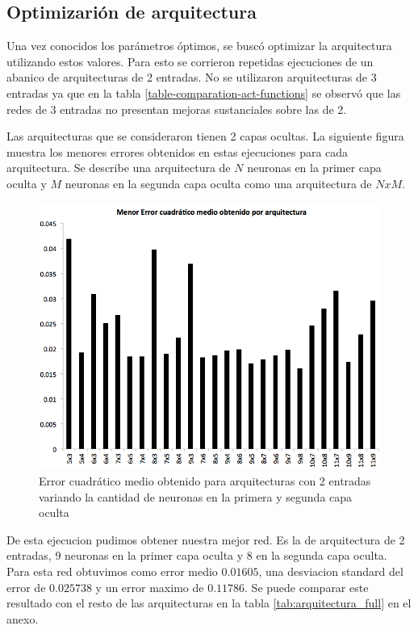 \documentclass[a4paper,10pt]{article}
\begin{document}
    \subsection{Optimizarión de arquitectura}
    \label{sec:arquitectura-optima}

    Una vez conocidos los parámetros óptimos, se buscó optimizar la arquitectura utilizando estos valores.
    Para esto se corrieron repetidas ejecuciones de un abanico de arquitecturas de 2 entradas.
    No se utilizaron arquitecturas de 3 entradas ya que en la tabla \ref{table-comparation-act-functions} se observó que las redes de 3 entradas no presentan mejoras sustanciales sobre las de 2.

    Las arquitecturas que se consideraron tienen 2 capas ocultas.
    La siguiente figura muestra los menores errores obtenidos en estas
    ejecuciones para cada arquitectura. Se describe una arquitectura de $N$
    neuronas en la primer capa oculta y $M$ neuronas en la segunda capa oculta
    como una arquitectura de $NxM$.

    \begin{figure}[H]
        \includegraphics[scale=0.5]{./images/arquitecturas.png}
        \caption{Error cuadrático medio obtenido para arquitecturas con 2 entradas variando la cantidad de neuronas en la primera y segunda capa oculta}
        \label{fig:arquitecturas}
    \end{figure}

    De esta ejecucion pudimos obtener nuestra mejor red.
    Es la de arquitectura de 2 entradas, 9 neuronas en la primer capa oculta y 8 en la segunda capa oculta.
    Para esta red obtuvimos como error medio $0.01605$, una desviacion standard del error de $0.025738$ y un error maximo de $0.11786$.
    Se puede comparar este resultado con el resto de las arquitecturas en la tabla \ref{tab:arquitectura_full} en el anexo.


\end{document}
